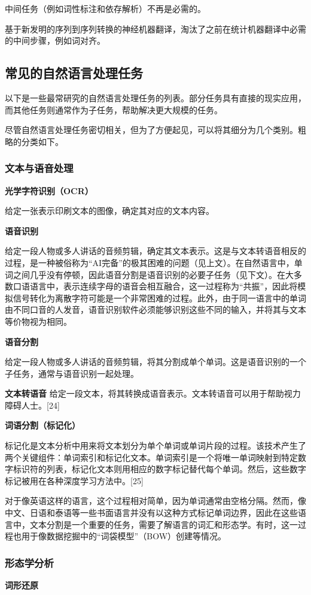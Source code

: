 中间任务（例如词性标注和依存解析）不再是必需的。

基于新发明的序列到序列转换的神经机器翻译，淘汰了之前在统计机器翻译中必需的中间步骤，例如词对齐。
\subsection{常见的自然语言处理任务}  
以下是一些最常研究的自然语言处理任务的列表。部分任务具有直接的现实应用，而其他任务则通常作为子任务，帮助解决更大规模的任务。

尽管自然语言处理任务密切相关，但为了方便起见，可以将其细分为几个类别。粗略的分类如下。
\subsubsection{文本与语音处理} 
\textbf{光学字符识别（OCR）}  

给定一张表示印刷文本的图像，确定其对应的文本内容。

\textbf{语音识别}  

给定一段人物或多人讲话的音频剪辑，确定其文本表示。这是与文本转语音相反的过程，是一种被俗称为“AI完备”的极其困难的问题（见上文）。在自然语言中，单词之间几乎没有停顿，因此语音分割是语音识别的必要子任务（见下文）。在大多数口语语言中，表示连续字母的语音会相互融合，这一过程称为“共振”，因此将模拟信号转化为离散字符可能是一个非常困难的过程。此外，由于同一语言中的单词由不同口音的人发音，语音识别软件必须能够识别这些不同的输入，并将其与文本等价物视为相同。

\textbf{语音分割}  

给定一段人物或多人讲话的音频剪辑，将其分割成单个单词。这是语音识别的一个子任务，通常与语音识别一起处理。

\textbf{文本转语音}  
给定一段文本，将其转换成语音表示。文本转语音可以用于帮助视力障碍人士。[24]

\textbf{词语分割（标记化）}  

标记化是文本分析中用来将文本划分为单个单词或单词片段的过程。该技术产生了两个关键组件：单词索引和标记化文本。单词索引是一个将唯一单词映射到特定数字标识符的列表，标记化文本则用相应的数字标记替代每个单词。然后，这些数字标记被用在各种深度学习方法中。[25]

对于像英语这样的语言，这个过程相对简单，因为单词通常由空格分隔。然而，像中文、日语和泰语等一些书面语言并没有以这种方式标记单词边界，因此在这些语言中，文本分割是一个重要的任务，需要了解语言的词汇和形态学。有时，这一过程也用于像数据挖掘中的“词袋模型”（BOW）创建等情况。
\subsubsection{形态学分析}  
\textbf{词形还原}  

